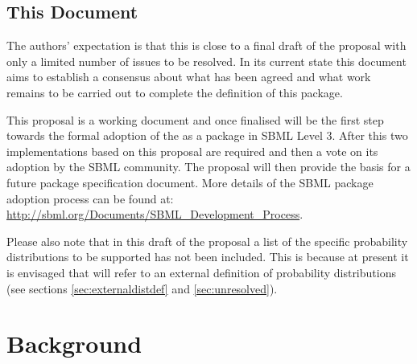\documentclass[draftspec]{sbmlpkgspec}
\begin{document}
\subsection{This Document}

The authors' expectation is that this is close to a final draft of the
proposal with only a limited number of issues to be resolved. In its
current state this document aims to establish a consensus about what
has been agreed and what work remains to be carried out to complete
the definition of this package.

This proposal is a working document and once finalised will be the
first step towards the formal adoption of the \distribshort as a
package in SBML Level 3. After this two implementations based on this
proposal are required and then a vote on its adoption by the SBML
community. The proposal will then provide the basis for a future
package specification document. More details of the SBML package
adoption process can be found at: 
\url{http://sbml.org/Documents/SBML_Development_Process}.

Please also note that in this draft of the proposal a list of the
specific probability distributions to be supported has not been
included. This is because at present it is envisaged that
\distribshort will refer to an external definition of probability
distributions (see sections \ref{sec:externaldistdef} and
\ref{sec:unresolved}).



\section{Background}
\end{document}
